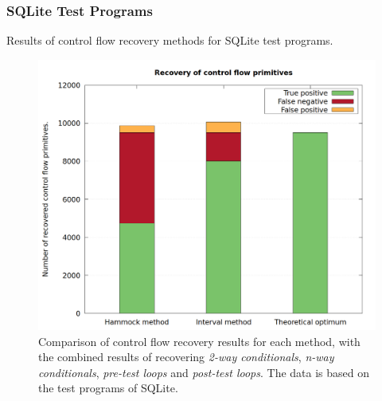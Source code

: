 
\clearpage

\subsubsection{SQLite Test Programs}
\label{app:sqlite_test_programs}

Results of control flow recovery methods for SQLite test programs.

\begin{figure}[htbp]
	\centering
	\includegraphics[width=\textwidth]{inc/appendices/test_program_results/sqlite/results_combined.png}
	\caption{Comparison of control flow recovery results for each method, with the combined results of recovering \textit{2-way conditionals}, \textit{n-way conditionals}, \textit{pre-test loops} and \textit{post-test loops}. The data is based on the test programs of SQLite.}
	\label{fig:sqlite_results_combined}
\end{figure}

